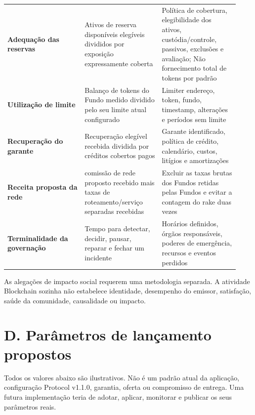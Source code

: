 \documentclass[11pt]{article}
\begin{document}
\begin{longtable}{P{0.31\linewidth} P{0.31\linewidth} P{0.31\linewidth}}
\textbf{Adequação das reservas} & Ativos de reserva disponíveis elegíveis divididos por exposição expressamente coberta & Política de cobertura, elegibilidade dos ativos, custódia/controle, passivos, exclusões e avaliação; Não fornecimento total de tokens por padrão \\
\textbf{Utilização de limite} & Balanço de tokens do Fundo medido dividido pelo seu limite atual configurado & Limiter endereço, token, fundo, timestamp, alterações e períodos sem limite \\
\textbf{Recuperação do garante} & Recuperação elegível recebida dividida por créditos cobertos pagos & Garante identificado, política de crédito, calendário, custos, litígios e amortizações \\
\textbf{Receita proposta da rede} & comissão de rede proposto recebido mais taxas de roteamento/serviço separadas recebidas & Excluir as taxas brutas dos Fundos retidas pelas Fundos e evitar a contagem do rake duas vezes \\
\textbf{Terminalidade da governação} & Tempo para detectar, decidir, pausar, reparar e fechar um incidente & Horários definidos, órgãos responsáveis, poderes de emergência, recursos e eventos perdidos \\
\bottomrule
\end{longtable}

As alegações de impacto social requerem uma metodologia separada. A atividade Blockchain sozinha não estabelece identidade, desempenho do emissor, satisfação, saúde da comunidade, causalidade ou impacto.


\section*{D. Parâmetros de lançamento propostos}

Todos os valores abaixo são ilustrativos. Não é um padrão atual da aplicação, configuração Protocol v1.1.0, garantia, oferta ou compromisso de entrega. Uma futura implementação teria de adotar, aplicar, monitorar e publicar os seus parâmetros reais.
\end{document}
